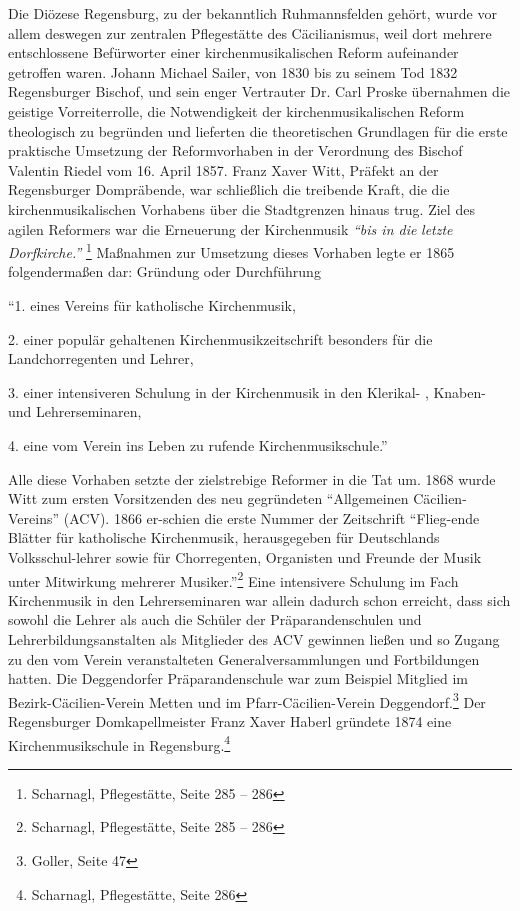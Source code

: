 \documentclass[a4paper]{article}
\newcommand\textstyleZitate[1]{\textit{#1}}
\begin{document}
Die Diözese Regensburg, zu der bekanntlich Ruhmannsfelden gehört, wurde
vor allem deswegen zur zentralen Pflegestätte des Cäcilianismus, weil
dort mehrere entschlossene Befürworter einer kirchenmusikalischen
Reform aufeinander getroffen waren. Johann Michael Sailer, von 1830 bis
zu seinem Tod 1832 Regensburger Bischof, und sein enger Vertrauter Dr.
Carl Proske übernahmen die geistige Vorreiterrolle, die Notwendigkeit
der kirchenmusikalischen Reform theologisch zu begründen und lieferten
die theoretischen Grundlagen für die erste praktische Umsetzung der
Reformvorhaben in der Verordnung des Bischof Valentin Riedel vom 16.
April 1857. Franz Xaver Witt, Präfekt an der Regensburger Dompräbende,
war schließlich die treibende Kraft, die die kirchenmusikalischen
Vorhabens über die Stadtgrenzen hinaus trug. Ziel des agilen Reformers
war die Erneuerung der Kirchenmusik \textstyleZitate{“bis in die
}\textstyleZitate{letzte Dorfkirche.” }\footnote{ Scharnagl,
Pflegestätte, Seite 285 – 286} Maßnahmen zur Umsetzung dieses Vorhaben
legte er 1865 folgendermaßen dar: Gründung oder Durchführung

“1. eines Vereins für katholische Kirchenmusik,

2. einer populär gehaltenen Kirchenmusikzeitschrift besonders für die
Landchorregenten und Lehrer,

3. einer intensiveren Schulung in der Kirchenmusik in den Klerikal- ,
Knaben- und Lehrerseminaren,

4. eine vom Verein ins Leben zu rufende Kirchenmusikschule.”

Alle diese Vorhaben setzte der zielstrebige Reformer in die Tat um. 1868
wurde Witt zum ersten Vorsitzenden des neu gegründeten “Allgemeinen
Cäcilien-Vereins” (ACV). 1866 er-schien die erste Nummer der
Zeitschrift “Flieg-ende Blätter für katholische Kirchenmusik,
herausgegeben für Deutschlands Volksschul-lehrer sowie für
Chorregenten, Organisten und Freunde der Musik unter Mitwirkung
mehrerer Musiker.”\footnote{ Scharnagl, Pflegestätte, Seite 285 – 286}
Eine intensivere Schulung im Fach Kirchenmusik in den Lehrerseminaren
war allein dadurch schon erreicht, dass sich sowohl die Lehrer als auch
die Schüler der Präparandenschulen und Lehrerbildungsanstalten als
Mitglieder des ACV gewinnen ließen und so Zugang zu den vom Verein
veranstalteten Generalversammlungen und Fortbildungen hatten. Die
Deggendorfer Präparandenschule war zum Beispiel Mitglied im
Bezirk-Cäcilien-Verein Metten und im Pfarr-Cäcilien-Verein
Deggendorf.\footnote{ Goller, Seite 47} Der Regensburger
Domkapellmeister Franz Xaver Haberl gründete 1874 eine
Kirchenmusikschule in Regensburg.\footnote{ Scharnagl, Pflegestätte,
Seite 286}
\end{document}

